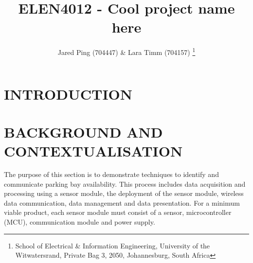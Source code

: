 \documentclass[10pt,twocolumn]{witseiepaper}
\begin{document}
	
	
\title{ELEN4012 - Cool project name here}
	
\author{Jared Ping (704447) \& Lara Timm (704157)
	\thanks{School of Electrical \& Information Engineering, University of the
			Witwatersrand, Private Bag 3, 2050, Johannesburg, South Africa}
}
	
\abstract{}
	
\keywords{}
	
\maketitle
\section{INTRODUCTION}




\section{BACKGROUND AND CONTEXTUALISATION}
	The purpose of this section is to demonstrate techniques to identify and communicate parking bay availability. This process includes data acquisition and processing using a sensor module, the deployment of the sensor module, wireless data communication, data management and data presentation. For a minimum viable product, each sensor module must consist of a sensor, microcontroller (MCU), communication module and power supply.
\end{document}
